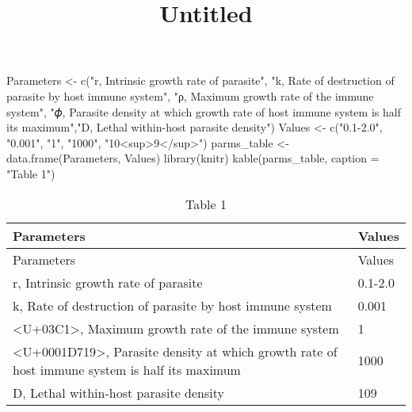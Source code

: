 \documentclass[
]{article}
\title{Untitled}
\author{}
\date{\vspace{-2.5em}}
\newenvironment{Shaded}{\begin{snugshade}}{\end{snugshade}}
\newcommand{\AttributeTok}[1]{\textcolor[rgb]{0.77,0.63,0.00}{#1}}
\newcommand{\FunctionTok}[1]{\textcolor[rgb]{0.00,0.00,0.00}{#1}}
\newcommand{\NormalTok}[1]{#1}
\newcommand{\OtherTok}[1]{\textcolor[rgb]{0.56,0.35,0.01}{#1}}
\newcommand{\StringTok}[1]{\textcolor[rgb]{0.31,0.60,0.02}{#1}}
\begin{document}
\maketitle

\begin{Shaded}
\begin{Highlighting}[]
\NormalTok{Parameters }\OtherTok{\textless{}{-}} \FunctionTok{c}\NormalTok{(}\StringTok{"r, Intrinsic growth rate of parasite"}\NormalTok{, }\StringTok{"k, Rate of destruction of parasite by host immune system"}\NormalTok{, }\StringTok{"ρ, Maximum growth rate of the immune system"}\NormalTok{, }\StringTok{"𝜙, Parasite density at which growth rate of host immune system is half its maximum"}\NormalTok{,}\StringTok{"D, Lethal within{-}host parasite density"}\NormalTok{)}
\NormalTok{Values }\OtherTok{\textless{}{-}} \FunctionTok{c}\NormalTok{(}\StringTok{"0.1{-}2.0"}\NormalTok{, }\StringTok{"0.001"}\NormalTok{, }\StringTok{"1"}\NormalTok{, }\StringTok{"1000"}\NormalTok{, }\StringTok{"10\textless{}sup\textgreater{}9\textless{}/sup\textgreater{}"}\NormalTok{)}
\NormalTok{parms\_table }\OtherTok{\textless{}{-}} \FunctionTok{data.frame}\NormalTok{(Parameters, Values)}
\FunctionTok{library}\NormalTok{(knitr)}
\FunctionTok{kable}\NormalTok{(parms\_table, }
      \AttributeTok{caption =} \StringTok{"Table 1"}\NormalTok{)}
\end{Highlighting}
\end{Shaded}

\begin{longtable}[]{@{}ll@{}}
\caption{Table 1}\tabularnewline
\toprule
Parameters & Values\tabularnewline
\midrule
\endfirsthead
\toprule
Parameters & Values\tabularnewline
\midrule
\endhead
r, Intrinsic growth rate of parasite & 0.1-2.0\tabularnewline
k, Rate of destruction of parasite by host immune system &
0.001\tabularnewline
\textless U+03C1\textgreater, Maximum growth rate of the immune system &
1\tabularnewline
\textless U+0001D719\textgreater, Parasite density at which growth rate
of host immune system is half its maximum & 1000\tabularnewline
D, Lethal within-host parasite density & 109\tabularnewline
\bottomrule
\end{longtable}
\end{document}
